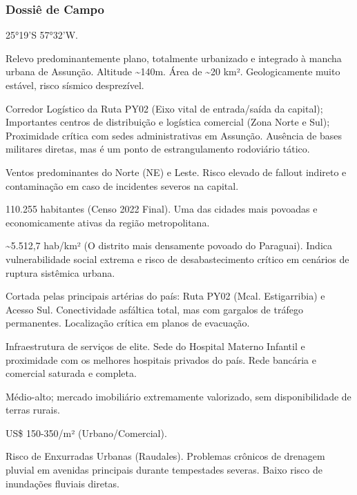\subsubsection{Dossiê de Campo}
\begin{description}[style=nextline,leftmargin=0.5cm,font=\bfseries]
\item[Coordenadas]  25°19'S 57°32'W.
\item[Topografia]  Relevo predominantemente plano, totalmente urbanizado e integrado à mancha urbana de Assunção. Altitude \textasciitilde 140m. Área de \textasciitilde 20 km². Geologicamente muito estável, risco sísmico desprezível.
\item[Alvos Estratégicos]  Corredor Logístico da Ruta PY02 (Eixo vital de entrada/\allowbreak saída da capital); Importantes centros de distribuição e logística comercial (Zona Norte e Sul); Proximidade crítica com sedes administrativas em Assunção. Ausência de bases militares diretas, mas é um ponto de estrangulamento rodoviário tático.
\item[Fallout]  Ventos predominantes do Norte (NE) e Leste. Risco elevado de fallout indireto e contaminação em caso de incidentes severos na capital.
\item[População]  110.255 habitantes (Censo 2022 Final). Uma das cidades mais povoadas e economicamente ativas da região metropolitana.
\item[Densidade]  \textasciitilde 5.512,7 hab/\allowbreak km² (O distrito mais densamente povoado do Paraguai). Indica vulnerabilidade social extrema e risco de desabastecimento crítico em cenários de ruptura sistêmica urbana.
\item[Vias de Acesso]  Cortada pelas principais artérias do país: Ruta PY02 (Mcal. Estigarribia) e Acesso Sul. Conectividade asfáltica total, mas com gargalos de tráfego permanentes. Localização crítica em planos de evacuação.
\item[Serviços]  Infraestrutura de serviços de elite. Sede do Hospital Materno Infantil e proximidade com os melhores hospitais privados do país. Rede bancária e comercial saturada e completa.
\item[Custo de Vida]  Médio-alto; mercado imobiliário extremamente valorizado, sem disponibilidade de terras rurais.
\item[Preço da Terra]  US\$ 150-350/\allowbreak m² (Urbano/\allowbreak Comercial).
\item[Hidrologia]  Risco de Enxurradas Urbanas (Raudales). Problemas crônicos de drenagem pluvial em avenidas principais durante tempestades severas. Baixo risco de inundações fluviais diretas.

\end{description}
